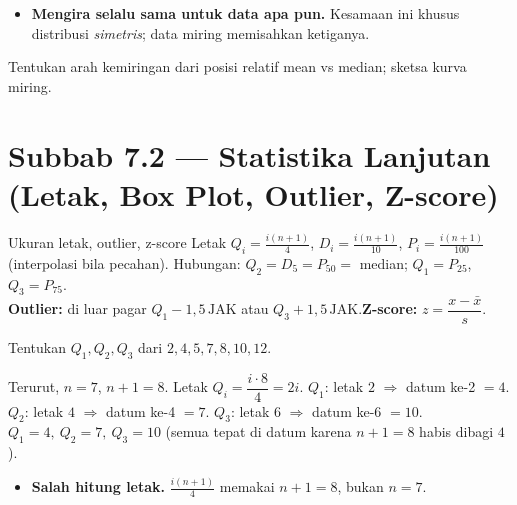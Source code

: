 \begin{jebakan}
\begin{itemize}[leftmargin=*,topsep=2pt]
  \item \textbf{Mengira selalu sama untuk data apa pun.} Kesamaan ini khusus
  distribusi \emph{simetris}; data miring memisahkan ketiganya.
\end{itemize}
\end{jebakan}

\begin{variasi}
Tentukan arah kemiringan dari posisi relatif mean vs median; sketsa kurva miring.
\end{variasi}

\section*{Subbab 7.2 — Statistika Lanjutan (Letak, Box Plot, Outlier, Z-score)}

\begin{ingat}{Ukuran letak, outlier, z-score}
Letak $Q_i=\frac{i(n+1)}{4}$, $D_i=\frac{i(n+1)}{10}$, $P_i=\frac{i(n+1)}{100}$
(interpolasi bila pecahan). Hubungan: $Q_2=D_5=P_{50}=$ median; $Q_1=P_{25}$,
$Q_3=P_{75}$.\\
\textbf{Outlier:} di luar pagar $Q_1-1{,}5\,\text{JAK}$ atau $Q_3+1{,}5\,
\text{JAK}$.\quad \textbf{Z-score:} $z=\dfrac{x-\bar x}{s}$.
\end{ingat}

\begin{soalbox}{}
Tentukan $Q_1,Q_2,Q_3$ dari $2,4,5,7,8,10,12$.
\end{soalbox}

\jawab
{} Terurut, $n=7$, $n+1=8$. Letak $Q_i=\dfrac{i\cdot8}{4}=2i$.
 $Q_1$: letak $2$ $\Rightarrow$ datum ke-2 $=4$.
 $Q_2$: letak $4$ $\Rightarrow$ datum ke-4 $=7$.
 $Q_3$: letak $6$ $\Rightarrow$ datum ke-6 $=10$.
\jadi $Q_1=4,\ Q_2=7,\ Q_3=10$ (semua tepat di datum karena $n+1=8$ habis dibagi
$4$).

\begin{jebakan}
\begin{itemize}[leftmargin=*,topsep=2pt]
  \item \textbf{Salah hitung letak.} $\frac{i(n+1)}{4}$ memakai $n+1=8$, bukan
  $n=7$.
\end{itemize}
\end{jebakan}

